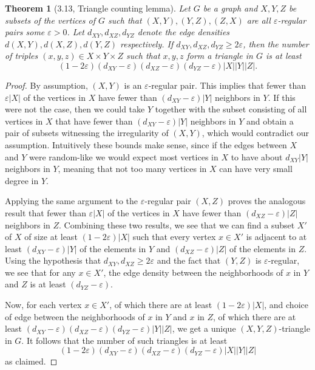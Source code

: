 \documentclass[UTF8,11pt]{ctexart}
\newtheorem*{theorem}{Theorem}
\theoremstyle{definition}
\begin{document}
\begin{theorem}[3.13, Triangle counting lemma]
Let $G$ be a graph and $X,Y,Z$ be subsets of the vertices of $G$ such that $(X,Y),(Y,Z),(Z,X)$ are all $\varepsilon$-regular pairs some $\varepsilon>0$. Let $d_{XY},d_{XZ},d_{YZ}$ denote the edge densities $d(X,Y),d(X,Z),d(Y,Z)$ respectively. If $d_{XY},d_{XZ},d_{YZ}\geq2\varepsilon$, then the number of triples $(x,y,z)\in X\times Y\times Z$ such that $x,y,z$ form a triangle in $G$ is at least
\[(1-2\varepsilon)(d_{XY}-\varepsilon)(d_{XZ}-\varepsilon)(d_{YZ}-\varepsilon)|X||Y||Z|.\]
\end{theorem}
\begin{proof}
By assumption, $(X,Y)$ is an $\varepsilon$-regular pair. This implies that fewer than $\varepsilon|X|$ of the vertices in $X$ have fewer than $(d_{XY}-\varepsilon)|Y|$ neighbors in $Y$. If this were not the case, then we could take $Y$ together with the subset consisting of all vertices in $X$ that have fewer than $(d_{XY}-\varepsilon)|Y|$ neighbors in $Y$ and obtain a pair of subsets witnessing the irregularity of $(X,Y)$, which would contradict our assumption. Intuitively these bounds make sense, since if the edges between $X$ and $Y$ were random-like we would expect most vertices in $X$ to have about $d_{XY}|Y|$ neighbors in $Y$, meaning that not too many vertices in $X$ can have very small degree in $Y$.

Applying the same argument to the $\varepsilon$-regular pair $(X,Z)$ proves the analogous result that fewer than $\varepsilon|X|$ of the vertices in $X$ have fewer than $(d_{XZ}-\varepsilon)|Z|$ neighbors in $Z$. Combining these two results, we see that we can find a subset $X'$ of $X$ of size at least $(1-2\varepsilon)|X|$ such that every vertex $x\in X'$ is adjacent to at least $(d_{XY}-\varepsilon)|Y|$ of the elements in $Y$ and $(d_{XZ}-\varepsilon)|Z|$ of the elements in $Z$. Using the hypothesis that $d_{XY},d_{XZ}\geq2\varepsilon$ and the fact that $(Y,Z)$ is $\varepsilon$-regular, we see that for any $x\in X'$, the edge density between the neighborhoods of $x$ in $Y$ and $Z$ is at least $(d_{YZ}-\varepsilon)$.

Now, for each vertex $x\in X'$, of which there are at least $(1-2\varepsilon)|X|$, and choice of edge between the neighborhoods of $x$ in $Y$ and $x$ in $Z$, of which there are at least $(d_{XY}-\varepsilon)(d_{XZ}-\varepsilon)(d_{YZ}-\varepsilon)|Y||Z|$, we get a unique $(X,Y,Z)$-triangle in $G$. It follows that the number of such triangles is at least
\[(1-2\varepsilon)(d_{XY}-\varepsilon)(d_{XZ}-\varepsilon)(d_{YZ}-\varepsilon)|X||Y||Z|\]
as claimed.
\end{proof}
\end{document}
